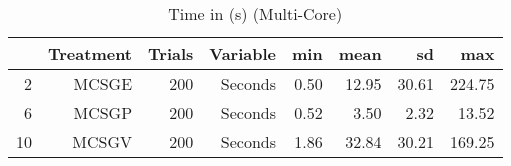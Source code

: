 \begin{table}[ht]
\centering
\begin{tabular}{rrrrrrrr}
  \hline
 & Treatment & Trials & Variable & min & mean & sd & max \\ 
  \hline
2 & MCSGE & 200 & Seconds & 0.50 & 12.95 & 30.61 & 224.75 \\ 
  6 & MCSGP & 200 & Seconds & 0.52 & 3.50 & 2.32 & 13.52 \\ 
  10 & MCSGV & 200 & Seconds & 1.86 & 32.84 & 30.21 & 169.25 \\ 
   \hline
\end{tabular}
\caption{Time in (s) (Multi-Core)} 
\end{table}
